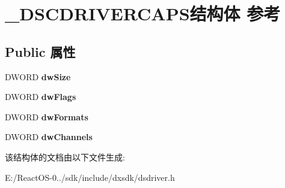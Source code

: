 \hypertarget{struct___d_s_c_d_r_i_v_e_r_c_a_p_s}{}\section{\+\_\+\+D\+S\+C\+D\+R\+I\+V\+E\+R\+C\+A\+P\+S结构体 参考}
\label{struct___d_s_c_d_r_i_v_e_r_c_a_p_s}
\subsection*{Public 属性}
\begin{DoxyCompactItemize}
\item 
\mbox{\label{struct___d_s_c_d_r_i_v_e_r_c_a_p_s_a4885ab06069bab68bf1204b91fb92598}} 
D\+W\+O\+RD {\bfseries dw\+Size}
\item 
\mbox{\label{struct___d_s_c_d_r_i_v_e_r_c_a_p_s_a1dc8680669bd8239d20b5ad690fa042c}} 
D\+W\+O\+RD {\bfseries dw\+Flags}
\item 
\mbox{\label{struct___d_s_c_d_r_i_v_e_r_c_a_p_s_a807d9e59e51da5445206e87f1d62f536}} 
D\+W\+O\+RD {\bfseries dw\+Formats}
\item 
\mbox{\label{struct___d_s_c_d_r_i_v_e_r_c_a_p_s_a0a9dc04c3d079e13a0b32aa39b415bec}} 
D\+W\+O\+RD {\bfseries dw\+Channels}
\end{DoxyCompactItemize}


该结构体的文档由以下文件生成\+:\begin{DoxyCompactItemize}
\item 
E\+:/\+React\+O\+S-\/0../sdk/include/dxsdk/dsdriver.\+h\end{DoxyCompactItemize}
